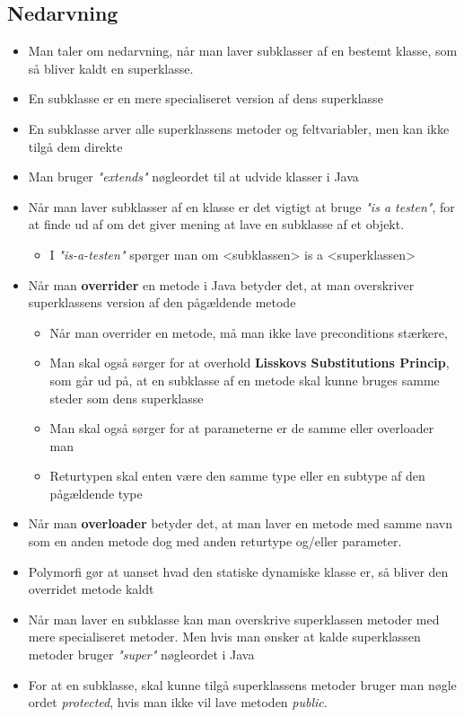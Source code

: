 \documentclass{article}
\begin{document}
\subsection{Nedarvning}
\begin{itemize}
	\item Man taler om nedarvning, når man laver subklasser af en bestemt klasse, som så bliver kaldt en superklasse.
	\item En subklasse er en mere specialiseret version af dens superklasse
	\item En subklasse arver alle superklassens metoder og feltvariabler, men kan ikke tilgå dem direkte
	\item Man bruger \textit{"extends"} nøgleordet til at udvide klasser i Java
	\item Når man laver subklasser af en klasse er det vigtigt at bruge \textit{"is a testen"}, for at finde ud af om det giver mening at lave en subklasse af et objekt.
	\begin{itemize}
		\item I \textit{"is-a-testen"} spørger man om <subklassen> is a <superklassen>
	\end{itemize}
	\item Når man \textbf{overrider} en metode i Java betyder det, at man overskriver superklassens version af den pågældende metode
	\begin{itemize}
		\item Når man overrider en metode, må man ikke lave preconditions stærkere,
		\item Man skal også sørger for at overhold \textbf{Lisskovs Substitutions Princip}, som går ud på, at en subklasse af en metode skal kunne bruges samme steder som dens superklasse 
		\item Man skal også sørger for at parameterne er de samme eller overloader man
		\item Returtypen skal enten være den samme type eller en subtype af den pågældende type 
	\end{itemize}
	\item Når man \textbf{overloader} betyder det, at man laver en metode med samme navn som en anden metode dog med anden returtype og/eller parameter.
	\item Polymorfi gør at uanset hvad den statiske dynamiske klasse er, så bliver den overridet metode kaldt	
	\item Når man laver en subklasse kan man overskrive superklassen metoder med mere specialiseret metoder. Men hvis man ønsker at kalde superklassen metoder bruger \textit{"super"} nøgleordet i Java
	\item For at en subklasse, skal kunne tilgå superklassens metoder bruger man nøgle ordet \textit{protected}, hvis man ikke vil lave metoden \textit{public}.
\end{itemize}
\end{document}
